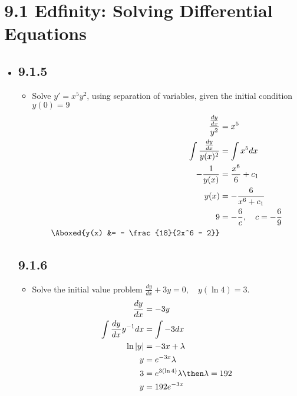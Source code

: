 
\section{9.1 Edfinity: Solving Differential Equations}
\begin{itemize}
  \item[]

  \subsection{9.1.5}
  \begin{itemize}
    \item Solve \( y' = x^5y^2 \), using separation of variables, given the
      initial condition \( y\left( 0 \right) = 9   \)
      \begin{align*}
        \frac{\frac{dy}{dx}}{y^2} &= x^5\\
        \int \frac{\frac{dy}{dx}}{y(x)^2} &= \int x^5 dx \\
        -\frac{1}{y(x)} &= \frac{x^6}{6} + c_1 \\
        y(x) &= -\frac{6}{x^6 + c_1} \\
        9 &= - \frac{6}{c}, \quad c = -\frac{6}{9} \\
        \Aboxed{y(x) &= - \frac{18}{2x^6 - 2}}
      \end{align*}
  \end{itemize}

  \subsection{9.1.6}
  \begin{itemize}
    \item Solve the initial value problem \( \frac{dy}{dx} + 3y = 0,\quad y(\ln 4) =
      3 \).
    \begin{align*}
      \frac{dy}{dx} &= -3y \\
      \int \frac{dy}{dx} y^{-1}dx &= \int -3dx \\
      \ln|y| &= -3x + \lambda \\
      y &= e^{-3x} \lambda \\
      3 &= e^{3(\ln 4)} \lambda \then \lambda = 192 \\
      y &= 192e^{-3x}
    \end{align*}

  \end{itemize}


\end{itemize}
